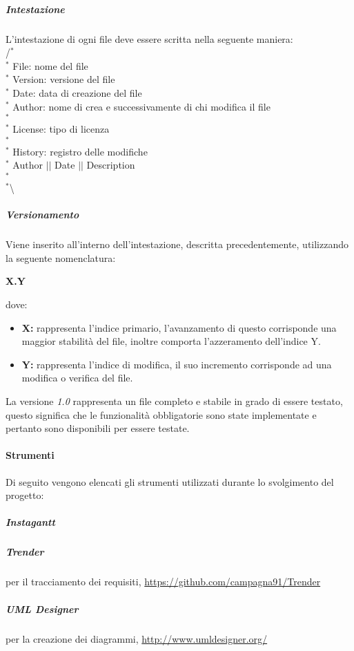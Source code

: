 \subparagraph{Intestazione}
L'intestazione di ogni file deve essere scritta nella seguente maniera: \\
/$^{*}$\\
$^{*}$ File: nome del file \\
$^{*}$ Version: versione del file \\
$^{*}$ Date: data di creazione del file \\
$^{*}$ Author: nome di crea e successivamente di chi modifica il file \\
$^{*}$ \\
$^{*}$ License: tipo di licenza \\
$^{*}$ \\
$^{*}$ History: registro delle modifiche \\
$^{*}$ Author $\vert$$\vert$ Date $\vert$$\vert$ Description \\
$^{*}$ \\
$^{*}$\textbackslash

\subparagraph{Versionamento}
Viene inserito all'interno dell'intestazione, descritta precedentemente, utilizzando la seguente nomenclatura:
\begin{center}
	\textbf{X.Y}
\end{center}
dove:
\begin{itemize}
	\item \textbf{X:} rappresenta l'indice primario, l'avanzamento di questo corrisponde una maggior stabilità del file, inoltre comporta l'azzeramento dell'indice Y.
	\item \textbf{Y:} rappresenta l'indice di modifica, il suo incremento corrisponde ad una modifica o verifica del file. 
\end{itemize}
La versione \textit{1.0} rappresenta un file completo e stabile in grado di essere testato, questo significa che le funzionalità obbligatorie sono state implementate e pertanto sono disponibili per essere testate.

\paragraph{Strumenti}
Di seguito vengono elencati gli strumenti utilizzati durante lo svolgimento del progetto:

\subparagraph{Instagantt}
\subparagraph{Trender}
per il tracciamento dei requisiti, \url{https://github.com/campagna91/Trender}
\subparagraph{UML Designer}
per la creazione dei diagrammi, \url{http://www.umldesigner.org/}



